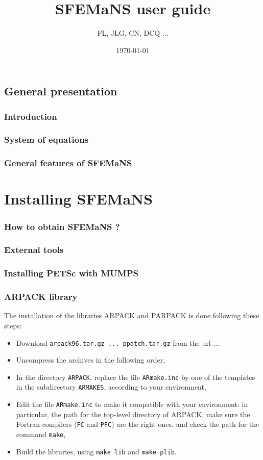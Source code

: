 \documentclass[a4paper]{book}
\title{SFEMaNS user guide}
\author{FL, JLG, CN, DCQ ...}
\date{\today}
\begin{document}
\newcommand{\vertical}[1]{\rotatebox{90}{\makebox{#1}}}

\maketitle
\tableofcontents
\section{General presentation}
\subsection{Introduction}
\subsection{System of equations}
\subsection{General features of SFEMaNS}

\chapter{Installing SFEMaNS}
\subsection{How to obtain SFEMaNS ?}
\subsection{External tools}
\subsection{Installing PETSc with MUMPS}
\subsection{ARPACK library}
The installation of the libraries ARPACK and PARPACK is done following these steps:
\begin{itemize}
\item Download \verb?arpack96.tar.gz ... ppatch.tar.gz? from the url ...
\item Uncompress the archives in the following order,
\item In the directory \verb?ARPACK?, replace the file \verb?ARmake.inc? by one of the templates in the subdirectory \verb?ARMAKES?, according to your environment,
\item Edit the file \verb?ARmake.inc? to make it compatible with your environment: in particular, the path for the top-level directory of ARPACK, make sure the Fortran compilers (\verb?FC? and \verb?PFC?) are the right ones, and check the path for the command \verb?make?,
\item Build the libraries, using \verb?make lib? and \verb?make plib?.
\end{itemize}
\end{document}
